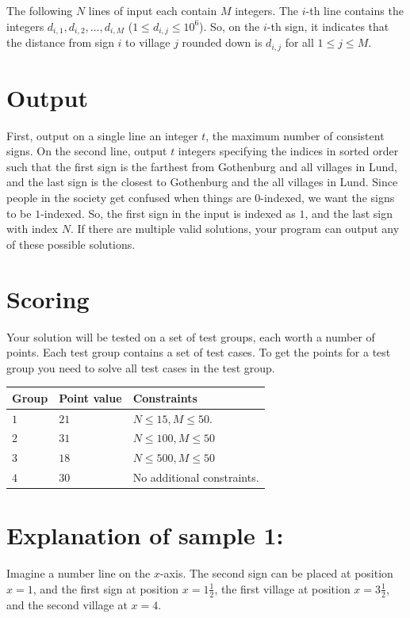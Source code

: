 The following $N$ lines of input each contain $M$ integers. The $i$-th line contains the integers $d_{i,1}, d_{i,2}, \ldots, d_{i,M}$ ($1 \leq d_{i,j} \leq 10^6$). 
So, on the $i$-th sign, it indicates that the distance from sign $i$ to village $j$ rounded down is $d_{i,j}$ for all $1 \leq j \leq M$.

\section*{Output}
\noindent
First, output on a single line an integer $t$, the maximum number of consistent signs.
On the second line, output $t$ integers specifying the indices in sorted order such that the first sign is the farthest from Gothenburg and all villages in Lund, 
and the last sign is the closest to Gothenburg and the all villages in Lund.
Since people in the society get confused when things are $0$-indexed, we want the signs to be $1$-indexed. 
So, the first sign in the input is indexed as $1$, and the last sign with index $N$.
If there are multiple valid solutions, your program can output any of these possible solutions.

\section*{Scoring}
Your solution will be tested on a set of test groups, each worth a number of points. 
Each test group contains a set of test cases. 
To get the points for a test group you need to solve all test cases in the test group.

\noindent
\begin{tabular}{| l | l | p{12cm} |}
  \hline
  \textbf{Group} & \textbf{Point value} & \textbf{Constraints} \\ \hline
  $1$    & $21$         & $N \leq 15, M \leq 50$.  \\ \hline
  $2$    & $31$         & $N \leq 100, M \leq 50$ \\ \hline
  $3$    & $18$         & $N \leq 500, M \leq 50$ \\ \hline
  $4$    & $30$         & No additional constraints. \\ \hline
\end{tabular}



\section*{Explanation of sample 1:}
Imagine a number line on the $x$-axis.
The second sign can be placed at position $x = 1$, 
and the first sign at position $x = 1\frac{1}{2}$, 
the first village at position $x = 3\frac{1}{2}$, 
and the second village at $x = 4$.

